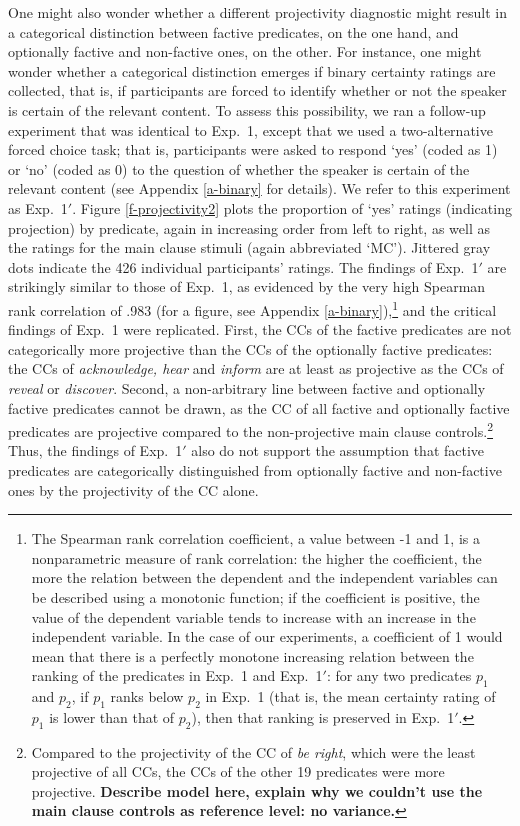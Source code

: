 \documentclass[11pt,fleqn]{article}
\newcommand{\6}{\mbox{$[\hspace*{-.6mm}[$}}
\newcommand{\9}{\mbox{$]\hspace*{-.6mm}]$}}
\begin{document}
One might also wonder whether a different projectivity diagnostic might result in a categorical distinction between factive predicates, on the one hand, and optionally factive and non-factive ones, on the other. For instance, one might wonder whether a categorical distinction emerges if binary certainty ratings are collected, that is, if participants are forced to identify whether or not the speaker is certain of the relevant content. To assess this possibility, we ran a follow-up experiment that was identical to Exp.~1, except that we used a two-alternative forced choice task; that is, participants were asked to respond `yes' (coded as 1) or `no' (coded as 0) to the question of whether the speaker is certain of the relevant content (see Appendix \ref{a-binary} for details). We refer to this experiment as Exp.~1$'$. Figure \ref{f-projectivity2} plots the proportion of `yes' ratings (indicating projection) by predicate, again in increasing order from left to right, as well as the ratings for the main clause stimuli (again abbreviated `MC'). Jittered gray dots indicate the 426 individual participants' ratings. The findings of Exp.~1$'$ are strikingly similar to those of Exp.~1, as evidenced by the very high Spearman rank correlation of .983 (for a figure, see Appendix \ref{a-binary}),\footnote{The Spearman rank correlation coefficient, a value between -1 and 1, is a nonparametric measure of rank correlation: the higher the coefficient, the more the relation between the dependent and the independent variables can be described using a monotonic function; if the coefficient is positive, the value of the dependent variable tends to increase with an increase in the independent variable. In the case of our experiments, a coefficient of 1 would mean that there is a perfectly monotone increasing relation between the ranking of the predicates in Exp.~1 and Exp.~1$'$: for any two predicates $p_1$ and $p_2$, if $p_1$ ranks below $p_2$ in Exp.~1 (that is, the mean certainty rating of $p_1$ is lower than that of $p_2$), then that ranking is preserved in Exp.~1$'$.} and the critical findings of Exp.~1 were replicated. First, the CCs of the factive predicates are not categorically more projective than the CCs of the optionally factive predicates:  the CCs of {\em acknowledge, hear} and {\em inform} are at least as projective as the CCs of {\em reveal} or {\em discover}. Second, a non-arbitrary line between factive and optionally factive predicates cannot be drawn, as the CC of all factive and optionally factive predicates are projective compared to the non-projective main clause controls.\footnote{Compared to the projectivity of the CC of {\em be right}, which were the least projective of all CCs, the CCs of the other 19 predicates were more projective. {\bf Describe model here, explain why we couldn't use the main clause controls as reference level: no variance.}}  Thus, the findings of Exp.~1$'$ also do not support the assumption that factive predicates are categorically distinguished from optionally factive and non-factive ones by the projectivity of the CC alone. 
\end{document}
